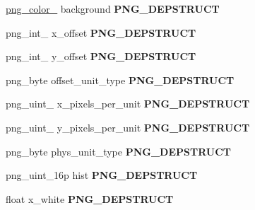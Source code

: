 \begin{DoxyCompactItemize}
\item 
\hyperlink{structpng__color__16__struct}{png\+\_\+color\+\_} background {\bfseries P\+N\+G\+\_\+\+D\+E\+P\+S\+T\+R\+U\+CT}\hypertarget{structpng__info__struct_a412cb3a79238a173719e2803ddf328bd}{}\label{structpng__info__struct_a412cb3a79238a173719e2803ddf328bd}

\item 
png\+\_\+int\+\_ x\+\_\+offset {\bfseries P\+N\+G\+\_\+\+D\+E\+P\+S\+T\+R\+U\+CT}\hypertarget{structpng__info__struct_af16b1e04d8a38208cb092e9f36da32a1}{}\label{structpng__info__struct_af16b1e04d8a38208cb092e9f36da32a1}

\item 
png\+\_\+int\+\_ y\+\_\+offset {\bfseries P\+N\+G\+\_\+\+D\+E\+P\+S\+T\+R\+U\+CT}\hypertarget{structpng__info__struct_a34fea44c406a0b887459818f73ffd038}{}\label{structpng__info__struct_a34fea44c406a0b887459818f73ffd038}

\item 
png\+\_\+byte offset\+\_\+unit\+\_\+type {\bfseries P\+N\+G\+\_\+\+D\+E\+P\+S\+T\+R\+U\+CT}\hypertarget{structpng__info__struct_a486aa9581c54722455d04a49fdbb8278}{}\label{structpng__info__struct_a486aa9581c54722455d04a49fdbb8278}

\item 
png\+\_\+uint\+\_ x\+\_\+pixels\+\_\+per\+\_\+unit {\bfseries P\+N\+G\+\_\+\+D\+E\+P\+S\+T\+R\+U\+CT}\hypertarget{structpng__info__struct_a34fee261da8e0c1ca23b80f4d1ad6e94}{}\label{structpng__info__struct_a34fee261da8e0c1ca23b80f4d1ad6e94}

\item 
png\+\_\+uint\+\_ y\+\_\+pixels\+\_\+per\+\_\+unit {\bfseries P\+N\+G\+\_\+\+D\+E\+P\+S\+T\+R\+U\+CT}\hypertarget{structpng__info__struct_a1a07ec3f8e9df781f3e3256afd587f85}{}\label{structpng__info__struct_a1a07ec3f8e9df781f3e3256afd587f85}

\item 
png\+\_\+byte phys\+\_\+unit\+\_\+type {\bfseries P\+N\+G\+\_\+\+D\+E\+P\+S\+T\+R\+U\+CT}\hypertarget{structpng__info__struct_a77109f218d008efcd3925926212e68be}{}\label{structpng__info__struct_a77109f218d008efcd3925926212e68be}

\item 
png\+\_\+uint\+\_\+16p hist {\bfseries P\+N\+G\+\_\+\+D\+E\+P\+S\+T\+R\+U\+CT}\hypertarget{structpng__info__struct_a5cd2d6bcebc7dd30e2ed64603b181338}{}\label{structpng__info__struct_a5cd2d6bcebc7dd30e2ed64603b181338}

\item 
float x\+\_\+white {\bfseries P\+N\+G\+\_\+\+D\+E\+P\+S\+T\+R\+U\+CT}\hypertarget{structpng__info__struct_ae3c58d4c32caf275c469b841c13c6178}{}\label{structpng__info__struct_ae3c58d4c32caf275c469b841c13c6178}


\end{DoxyCompactItemize}
